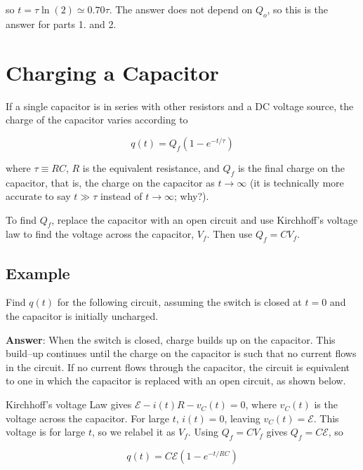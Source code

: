\documentclass{article}
\begin{document}
so $t=\tau\ln(2)\simeq 0.70\tau$. The answer does not depend on $Q_o$, so this is the answer for parts 1. and 2.
\else

\newpage
\fi
\ifsolutions\else
\newpage
\fi

\section{Charging a Capacitor}

If a single capacitor is in series with other resistors and a DC voltage source, the charge of the capacitor varies according to 

\begin{equation}
q(t)=Q_f(1-e^{-t/\tau})
\end{equation}

where $\tau\equiv RC$, $R$ is the equivalent resistance, and $Q_f$ is the final charge on the capacitor, that is, the charge on the capacitor as $t\rightarrow\infty$ (it is technically more accurate to say $t\gg \tau$ instead of $t\rightarrow\infty$; why?).

To find $Q_f$, replace the capacitor with an open circuit and use Kirchhoff's voltage law to find the voltage across the capacitor, $V_f$. Then use $Q_f=CV_f$.

\subsection{Example}

Find $q(t)$ for the following circuit, assuming the switch is closed at $t=0$ and the capacitor is initially uncharged.



\textbf{Answer}: When the switch is closed, charge builds up on the capacitor. This build--up continues until the charge on the capacitor is such that no current flows in the circuit. If no current flows through the capacitor, the circuit is equivalent to one in which the capacitor is replaced with an open circuit, as shown below. 



Kirchhoff's voltage Law gives $\mathcal{E}-i(t)R-v_C(t)=0$, where $v_C(t)$ is the voltage across the capacitor. For large $t$, $i(t)=0$, leaving $v_{C}(t)=\mathcal{E}$. This voltage is for large $t$, so we relabel it as $V_f$. Using $Q_f=CV_f$ gives $Q_f=C\mathcal{E}$, so

\begin{equation}
q(t)=C\mathcal{E}(1-e^{-t/RC})
\end{equation}
\end{document}
